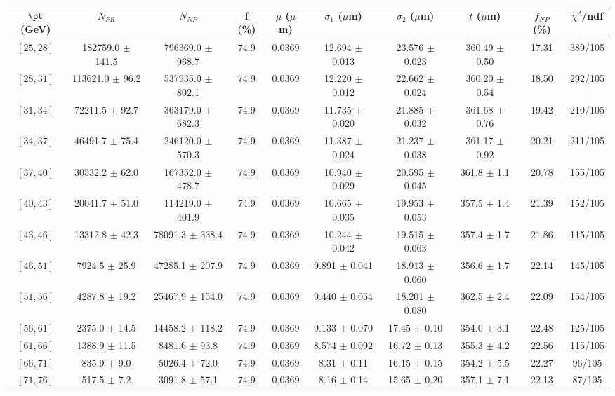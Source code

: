 \begin{tabular}{c||c|c|c|c|c|c|c||c|c}
$\pt$ (GeV) & $N_{PR}$ & $N_{NP}$ & f (\%) & $\mu$ ($\mu$m) & $\sigma_1$ ($\mu$m) & $\sigma_2$ ($\mu$m)  & $t$ ($\mu$m) & $f_{NP}$ (\%) & $\chi^2$/ndf \\
\hline
$[25, 28]$ & 182759.0 $\pm$ 141.5 & 796369.0 $\pm$ 968.7 & 74.9 & 0.0369 & 12.694 $\pm$ 0.013 & 23.576 $\pm$ 0.023 & 360.49 $\pm$ 0.50 & 17.31 & 389/105\\
$[28, 31]$ & 113621.0 $\pm$ 96.2 & 537935.0 $\pm$ 802.1 & 74.9 & 0.0369 & 12.220 $\pm$ 0.012 & 22.662 $\pm$ 0.024 & 360.20 $\pm$ 0.54 & 18.50 & 292/105\\
$[31, 34]$ & 72211.5 $\pm$ 92.7 & 363179.0 $\pm$ 682.3 & 74.9 & 0.0369 & 11.735 $\pm$ 0.020 & 21.885 $\pm$ 0.032 & 361.68 $\pm$ 0.76 & 19.42 & 210/105\\
$[34, 37]$ & 46491.7 $\pm$ 75.4 & 246120.0 $\pm$ 570.3 & 74.9 & 0.0369 & 11.387 $\pm$ 0.024 & 21.237 $\pm$ 0.038 & 361.17 $\pm$ 0.92 & 20.21 & 211/105\\
$[37, 40]$ & 30532.2 $\pm$ 62.0 & 167352.0 $\pm$ 478.7 & 74.9 & 0.0369 & 10.940 $\pm$ 0.029 & 20.595 $\pm$ 0.045 & 361.8 $\pm$ 1.1 & 20.78 & 155/105\\
$[40, 43]$ & 20041.7 $\pm$ 51.0 & 114219.0 $\pm$ 401.9 & 74.9 & 0.0369 & 10.665 $\pm$ 0.035 & 19.953 $\pm$ 0.053 & 357.5 $\pm$ 1.4 & 21.39 & 152/105\\
$[43, 46]$ & 13312.8 $\pm$ 42.3 & 78091.3 $\pm$ 338.4 & 74.9 & 0.0369 & 10.244 $\pm$ 0.042 & 19.515 $\pm$ 0.063 & 357.4 $\pm$ 1.7 & 21.86 & 115/105\\
$[46, 51]$ & 7924.5 $\pm$ 25.9 & 47285.1 $\pm$ 207.9 & 74.9 & 0.0369 & 9.891 $\pm$ 0.041 & 18.913 $\pm$ 0.060 & 356.6 $\pm$ 1.7 & 22.14 & 145/105\\
$[51, 56]$ & 4287.8 $\pm$ 19.2 & 25467.9 $\pm$ 154.0 & 74.9 & 0.0369 & 9.440 $\pm$ 0.054 & 18.201 $\pm$ 0.080 & 362.5 $\pm$ 2.4 & 22.09 & 154/105\\
$[56, 61]$ & 2375.0 $\pm$ 14.5 & 14458.2 $\pm$ 118.2 & 74.9 & 0.0369 & 9.133 $\pm$ 0.070 & 17.45 $\pm$ 0.10 & 354.0 $\pm$ 3.1 & 22.48 & 125/105\\
$[61, 66]$ & 1388.9 $\pm$ 11.5 & 8481.6 $\pm$ 93.8 & 74.9 & 0.0369 & 8.574 $\pm$ 0.092 & 16.72 $\pm$ 0.13 & 355.3 $\pm$ 4.2 & 22.56 & 115/105\\
$[66, 71]$ & 835.9 $\pm$ 9.0 & 5026.4 $\pm$ 72.0 & 74.9 & 0.0369 & 8.31 $\pm$ 0.11 & 16.15 $\pm$ 0.15 & 354.2 $\pm$ 5.5 & 22.27 & 96/105\\
$[71, 76]$ & 517.5 $\pm$ 7.2 & 3091.8 $\pm$ 57.1 & 74.9 & 0.0369 & 8.16 $\pm$ 0.14 & 15.65 $\pm$ 0.20 & 357.1 $\pm$ 7.1 & 22.13 & 87/105\\

\end{tabular}

